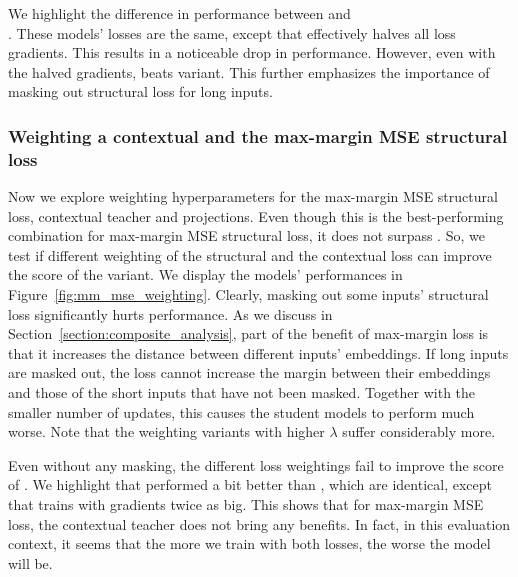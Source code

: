 We highlight the difference in performance between 
and \\ . These models' losses are the same, except that
 effectively halves all loss gradients. This results
in a noticeable drop in performance. However, even with the halved gradients,
 beats  variant. This further
emphasizes the importance of masking out structural loss for long inputs.

\subsubsection{Weighting a contextual and the max-margin MSE structural
loss}

Now we explore weighting hyperparameters for the max-margin MSE structural
loss,  contextual teacher and
 projections. Even though this is the best-performing combination for max-margin MSE structural loss, it does not
surpass . So, we test if different weighting of
the structural and the contextual loss can improve the score of the
 variant. We display the models' performances in
Figure~\ref{fig:mm_mse_weighting}. Clearly, masking out some inputs' structural
loss significantly hurts performance. As we discuss in
Section~\ref{section:composite_analysis}, part of the benefit of max-margin
loss is that it increases the distance between different inputs' embeddings. If
long inputs are masked out, the loss cannot increase the margin between their
embeddings and those of the short inputs that have not been masked.
Together with the smaller number of updates, this causes the student models to
perform much worse. Note that the weighting variants with higher $\lambda$
suffer considerably more.

Even without any masking, the different loss weightings fail to improve the
score of . We highlight that
 performed a bit better than ,
which are identical, except that  trains with
gradients twice as big. This shows that for max-margin MSE loss, the contextual teacher
does not bring any benefits. In fact, in this evaluation context, it seems that
the more we train with both losses, the worse the model will be.

